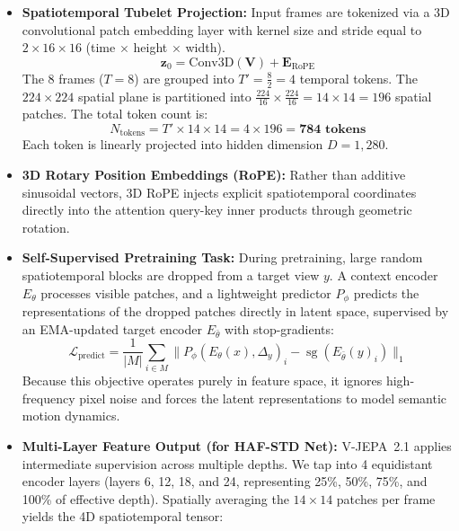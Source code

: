 \documentclass[a4paper, 11pt]{article}
\begin{document}
\begin{itemize}
    \item \textbf{Spatiotemporal Tubelet Projection:} Input frames are tokenized via a 3D convolutional patch embedding layer with kernel size and stride equal to $2 \times 16 \times 16$ (time $\times$ height $\times$ width).
    \begin{equation}
        \mathbf{z}_0 = \text{Conv3D}(\mathbf{V}) + \mathbf{E}_{\text{RoPE}}
    \end{equation}
    The 8 frames ($T=8$) are grouped into $T' = \frac{8}{2} = 4$ temporal tokens. The $224 \times 224$ spatial plane is partitioned into $\frac{224}{16} \times \frac{224}{16} = 14 \times 14 = 196$ spatial patches. The total token count is:
    \begin{equation}
        N_{\text{tokens}} = T' \times 14 \times 14 = 4 \times 196 = \mathbf{784\text{ tokens}}
    \end{equation}
    Each token is linearly projected into hidden dimension $D = 1,280$.
    \item \textbf{3D Rotary Position Embeddings (RoPE):} Rather than additive sinusoidal vectors, 3D RoPE injects explicit spatiotemporal coordinates directly into the attention query-key inner products through geometric rotation.
    \item \textbf{Self-Supervised Pretraining Task:} During pretraining, large random spatiotemporal blocks are dropped from a target view $y$. A context encoder $E_\theta$ processes visible patches, and a lightweight predictor $P_\phi$ predicts the representations of the dropped patches directly in latent space, supervised by an EMA-updated target encoder $E_{\bar{\theta}}$ with stop-gradients:
    \begin{equation}
        \mathcal{L}_{\text{predict}} = \frac{1}{|M|}\sum_{i \in M} \| P_\phi(E_\theta(x), \Delta_y)_i - \operatorname{sg}(E_{\bar{\theta}}(y)_i) \|_1
    \end{equation}
    Because this objective operates purely in feature space, it ignores high-frequency pixel noise and forces the latent representations to model semantic motion dynamics.
    \item \textbf{Multi-Layer Feature Output (for HAF-STD Net):} V-JEPA~2.1 applies intermediate supervision across multiple depths. We tap into 4 equidistant encoder layers (layers 6, 12, 18, and 24, representing 25\%, 50\%, 75\%, and 100\% of effective depth). Spatially averaging the $14 \times 14$ patches per frame yields the 4D spatiotemporal tensor:
    \begin{equation}

\end{equation}
\end{itemize}
\end{document}
